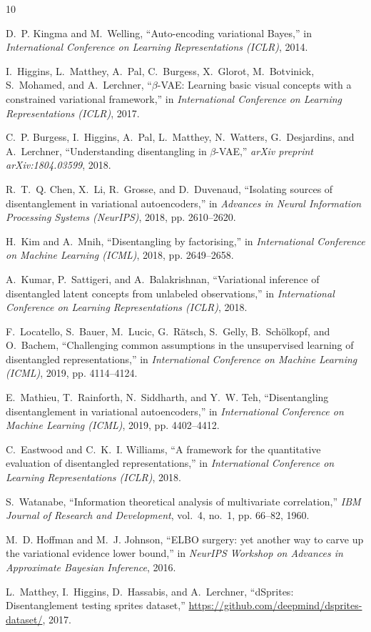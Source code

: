 \documentclass[11pt,a4paper]{article}
\begin{document}
\begin{thebibliography}{10}

D.~P. Kingma and M.~Welling, ``Auto-encoding variational {B}ayes,'' in \emph{International Conference on Learning Representations (ICLR)}, 2014.

I.~Higgins, L.~Matthey, A.~Pal, C.~Burgess, X.~Glorot, M.~Botvinick, S.~Mohamed, and A.~Lerchner, ``$\beta$-{VAE}: Learning basic visual concepts with a constrained variational framework,'' in \emph{International Conference on Learning Representations (ICLR)}, 2017.

C.~P. Burgess, I.~Higgins, A.~Pal, L.~Matthey, N.~Watters, G.~Desjardins, and A.~Lerchner, ``Understanding disentangling in $\beta$-{VAE},'' \emph{arXiv preprint arXiv:1804.03599}, 2018.

R.~T.~Q. Chen, X.~Li, R.~Grosse, and D.~Duvenaud, ``Isolating sources of disentanglement in variational autoencoders,'' in \emph{Advances in Neural Information Processing Systems (NeurIPS)}, 2018, pp. 2610--2620.

H.~Kim and A.~Mnih, ``Disentangling by factorising,'' in \emph{International Conference on Machine Learning (ICML)}, 2018, pp. 2649--2658.

A.~Kumar, P.~Sattigeri, and A.~Balakrishnan, ``Variational inference of disentangled latent concepts from unlabeled observations,'' in \emph{International Conference on Learning Representations (ICLR)}, 2018.

F.~Locatello, S.~Bauer, M.~Lucic, G.~R{\"a}tsch, S.~Gelly, B.~Sch{\"o}lkopf, and O.~Bachem, ``Challenging common assumptions in the unsupervised learning of disentangled representations,'' in \emph{International Conference on Machine Learning (ICML)}, 2019, pp. 4114--4124.

E.~Mathieu, T.~Rainforth, N.~Siddharth, and Y.~W. Teh, ``Disentangling disentanglement in variational autoencoders,'' in \emph{International Conference on Machine Learning (ICML)}, 2019, pp. 4402--4412.

C.~Eastwood and C.~K.~I. Williams, ``A framework for the quantitative evaluation of disentangled representations,'' in \emph{International Conference on Learning Representations (ICLR)}, 2018.

S.~Watanabe, ``Information theoretical analysis of multivariate correlation,'' \emph{IBM Journal of Research and Development}, vol.~4, no.~1, pp. 66--82, 1960.

M.~D. Hoffman and M.~J. Johnson, ``{ELBO} surgery: yet another way to carve up the variational evidence lower bound,'' in \emph{NeurIPS Workshop on Advances in Approximate Bayesian Inference}, 2016.

L.~Matthey, I.~Higgins, D.~Hassabis, and A.~Lerchner, ``{dSprites}: Disentanglement testing sprites dataset,'' \url{https://github.com/deepmind/dsprites-dataset/}, 2017.

\end{thebibliography}
\end{document}
